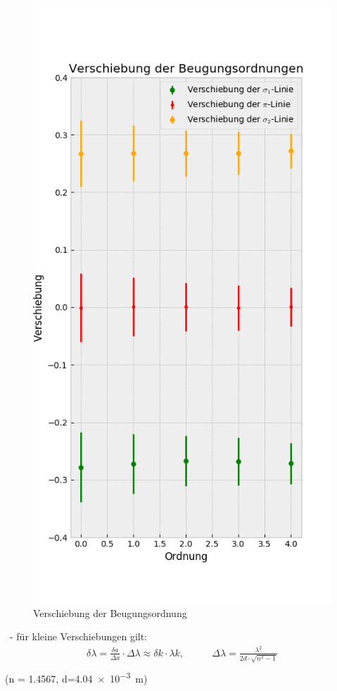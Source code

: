 \begin{myframe}{}
\begin{figure}
              \includegraphics[height=.85\paperheight]{img/diff_sco13A}
              \caption{Verschiebung der Beugungsordnung} 
          \end{figure}
      \end{myframe}
      \begin{myframe}{\subsecname\ - \subsubsecname}
        für kleine Verschiebungen gilt:
        \begin{align}
          \delta\lambda = \frac{\delta a}{\Delta a}\cdot \Delta\lambda\approx\delta k\cdot\lambda k,
          &\qquad\Delta\lambda = \frac{\lambda^2}{2d\cdot\sqrt{n^2-1}}\\
        \end{align}
        \scriptsize (n = \SI{1.4567}{}, d=\SI{4.04e-3}{m})
      \end{myframe}
